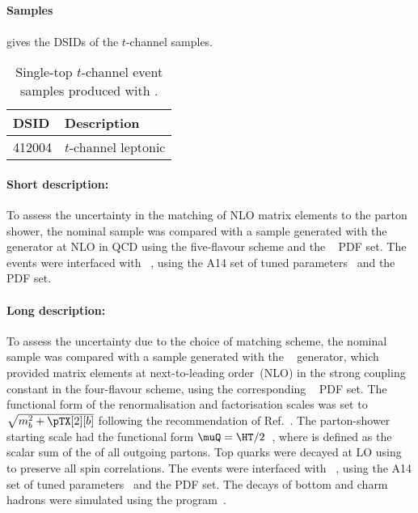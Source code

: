 \subsection[MadGraph5\_aMC@NLO+Pythia8]{\MGNLOPY[8]}
\label{subsubsec:tchan_aMCP8}

\paragraph{Samples}

 gives the DSIDs of the $t$-channel \MGNLOPY[8] samples.

\begin{table}[htbp]
  \caption{Single-top $t$-channel event samples produced with \MGNLOPY[8].}%
  \label{tab:tchan_aMCP8}
  \centering
  \begin{tabular}{l l}
    \toprule
    DSID & Description \\
    \midrule
    412004 & $t$-channel leptonic \\
    \bottomrule
  \end{tabular}
\end{table}

\paragraph{Short description:}

To assess the uncertainty in the matching of NLO matrix elements to the
parton shower, the nominal sample was compared with a sample generated
with the \MGNLO[2.6.2]~\cite{Alwall:2014hca} generator at NLO in QCD using the five-flavour
scheme and the \NNPDF[2.3nlo]~\cite{Ball:2014uwa} PDF set. The events were
interfaced with \PYTHIA[8.230]~\cite{Sjostrand:2014zea}, using the A14
set of tuned parameters~\cite{ATL-PHYS-PUB-2014-021} and the \NNPDF[2.3lo] PDF set.


\paragraph{Long description:}

To assess the uncertainty due to the choice of matching scheme, the nominal sample was compared with a sample generated
with the \MGNLO[2.6.2]~\cite{Alwall:2014hca} generator, which provided matrix elements at next-to-leading order~(NLO) in the strong coupling constant \alphas
in the four-flavour scheme, using the corresponding \NNPDF[3.0nlo]~\cite{Ball:2014uwa} PDF set.
The functional form of the renormalisation and factorisation scales was set to $\sqrt{m_b^2 + \pTX[2][b]}$
following the recommendation of Ref.~\cite{Frederix:2012dh}.
The parton-shower starting scale had the functional form $\muQ = \HT/2$~\cite{ATL-PHYS-PUB-2017-007}, 
where \HT is defined as the scalar sum of the \pT of all outgoing partons.
Top quarks were decayed at LO using \MADSPIN~\cite{Frixione:2007zp,Artoisenet:2012st} to preserve all spin correlations.
The events were interfaced with \PYTHIA[8.230]~\cite{Sjostrand:2014zea}, using the A14 set of tuned parameters~\cite{ATL-PHYS-PUB-2014-021} 
and the \NNPDF[2.3lo] PDF set.
The decays of bottom and charm hadrons were simulated using the \EVTGEN[1.6.0] program~\cite{Lange:2001uf}.


